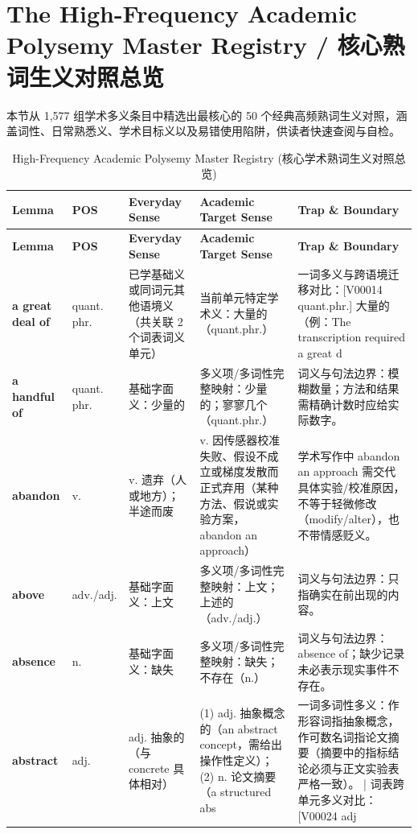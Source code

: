 \section{The High-Frequency Academic Polysemy Master Registry / 核心熟词生义对照总览}
本节从 1,577 组学术多义条目中精选出最核心的 50 个经典高频熟词生义对照，涵盖词性、日常熟悉义、学术目标义以及易错使用陷阱，供读者快速查阅与自检。

\begingroup
\ReportTableStyle
\begin{longtable}{>{\raggedright\arraybackslash}p{2.5cm}>{\raggedright\arraybackslash}p{1.6cm}>{\raggedright\arraybackslash}p{3.2cm}>{\raggedright\arraybackslash}p{3.6cm}>{\raggedright\arraybackslash}p{3.3cm}}
\caption{High-Frequency Academic Polysemy Master Registry (核心学术熟词生义对照总览)}\label{tab:polysemy_master}\tabularnewline
\toprule
\textbf{\color{AcadNavy}Lemma} & \textbf{\color{AcadNavy}POS} & \textbf{\color{AcadNavy}Everyday Sense} & \textbf{\color{AcadNavy}Academic Target Sense} & \textbf{\color{AcadNavy}Trap \& Boundary} \tabularnewline
\midrule
\endfirsthead
\toprule
\textbf{\color{AcadNavy}Lemma} & \textbf{\color{AcadNavy}POS} & \textbf{\color{AcadNavy}Everyday Sense} & \textbf{\color{AcadNavy}Academic Target Sense} & \textbf{\color{AcadNavy}Trap \& Boundary} \tabularnewline
\midrule
\endhead
\bottomrule
\endfoot
\textbf{a great deal of} & quant. phr. & 已学基础义或同词元其他语境义（共关联 2 个词表词义单元） & 当前单元特定学术义：大量的（quant.phr.） & 一词多义与跨语境迁移对比：[V00014 quant.phr.] 大量的（例：The transcription required a great d \tabularnewline
\textbf{a handful of} & quant. phr. & 基础字面义：少量的 & 多义项/多词性完整映射：少量的；寥寥几个（quant.phr.） & 词义与句法边界：模糊数量；方法和结果需精确计数时应给实际数字。 \tabularnewline
\textbf{abandon} & v. & v. 遗弃（人或地方）；半途而废 & v. 因传感器校准失败、假设不成立或梯度发散而正式弃用（某种方法、假说或实验方案，abandon an approach） & 学术写作中 abandon an approach 需交代具体实验/校准原因，不等于轻微修改（modify/alter），也不带情感贬义。 \tabularnewline
\textbf{above} & adv./adj. & 基础字面义：上文 & 多义项/多词性完整映射：上文；上述的（adv./adj.） & 词义与句法边界：只指确实在前出现的内容。 \tabularnewline
\textbf{absence} & n. & 基础字面义：缺失 & 多义项/多词性完整映射：缺失；不存在（n.） & 词义与句法边界：absence of；缺少记录未必表示现实事件不存在。 \tabularnewline
\textbf{abstract} & adj. & adj. 抽象的（与 concrete 具体相对） & (1)  adj. 抽象概念的（an abstract concept，需给出操作性定义）；(2)  n. 论文摘要（a structured abs & 一词多词性多义：作形容词指抽象概念，作可数名词指论文摘要（摘要中的指标结论必须与正文实验表严格一致）。 | 词表跨单元多义对比：[V00024 adj \tabularnewline

\end{longtable}
